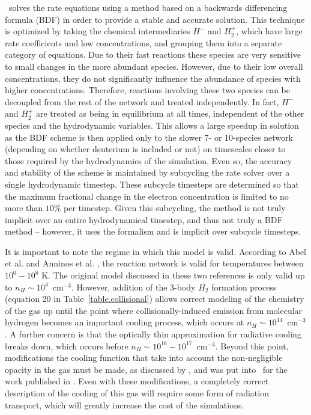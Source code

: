 \enzo\ solves the rate equations using a method based on a backwards
differencing formula (BDF) in order to provide a stable and accurate
solution. This technique is optimized by taking the chemical
intermediaries $H^-$ and $H_2^+$, which have large rate coefficients
and low concentrations, and grouping them into a separate category of
equations.  Due to their fast reactions these species are very
sensitive to small changes in the more abundant species.  However, due
to their low overall concentrations, they do not significantly
influence the abundance of species with higher concentrations.
Therefore, reactions involving these two species can be decoupled from
the rest of the network and treated independently.  In fact, $H^-$ and
$H_2^+$ are treated as being in equilibrium at all times, independent
of the other species and the hydrodynamic variables.  This allows a
large speedup in solution as the BDF scheme is then applied only to
the slower 7- or 10-species network (depending on whether deuterium is
included or not) on timescales closer to those required by the
hydrodynamics of the simulation.  Even so, the accuracy and stability
of the scheme is maintained by subcycling the rate solver over a
single hydrodynamic timestep.  These subcycle timesteps are determined
so that the maximum fractional change in the electron concentration is
limited to no more than $10\%$ per timestep.  Given this subcycling,
the method is not truly implicit over an entire hydrodynamical
timestep, and thus not truly a BDF method -- however, it uses the
formalism and is implicit over subcycle timesteps.


It is important to note the regime in which this model is valid.
According to Abel et al. and Anninos et al. \citep{abel97,anninos97},
the reaction network is valid for temperatures between $10^0 - 10^8$
K.  The original model discussed in these two references is only valid
up to $n_H \sim 10^4$~cm$^{-3}$.  However, addition of the 3-body
$H_2$ formation process (equation 20 in Table~\ref{table.collisional})
allows correct modeling of the chemistry of the gas up until the point
where collisionally-induced emission from molecular hydrogen becomes
an important cooling process, which occurs at $n_H \sim
10^{14}$~cm$^{-3}$.  A further concern is that the optically thin
approximation for radiative cooling breaks down, which occurs before
$n_H \sim 10^{16} - 10^{17}$~cm$^{-3}$.  Beyond this point,
modifications the cooling function that take into account the
non-negligible opacity in the gas must be made, as discussed by
\citet{2004MNRAS.348.1019R}, and was put into \enzo\ for the work
published in \citep{2009Sci...325..601T,2009PhDT.........5T}.  Even with these
modifications, a completely correct description of the cooling of this
gas will require some form of radiation transport, which will greatly
increase the cost of the simulations.

